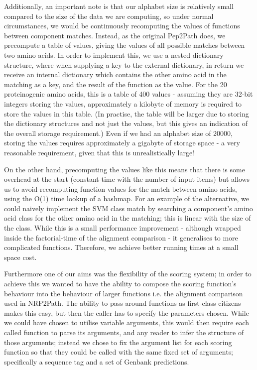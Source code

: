 \documentclass{l4proj}
\begin{document}
Additionally, an important note is that our alphabet size is relatively small compared to the size of the data we are computing, so under normal circumstances, we would be continuously recomputing the values of functions between component matches. Instead, as the original Pep2Path does, we precompute a table of values, giving the values of all possible matches between two amino acids. In order to implement this, we use a nested dictionary structure, where when supplying a key to the external dictionary, in return we receive an internal dictionary which contains the other amino acid in the matching as a key, and the result of the function as the value. For the 20 proteinogenic amino acids, this is a table of 400 values - assuming they are 32-bit integers storing the values, approximately a kilobyte of memory is required to store the values in this table. (In practise, the table will be larger due to storing the dictionary structures and not just the values, but this gives an indication of the overall storage requirement.) Even if we had an alphabet size of 20000, storing the values requires approximately a gigabyte of storage space - a very reasonable requirement, given that this is unrealistically large!

On the other hand, precomputing the values like this means that there is some overhead at the start (constant-time with the number of input items) but allows us to avoid recomputing function values for the match between amino acids, using the O(1) time lookup of a hashmap. For an example of the alternative, we could naively implement the SVM class match by searching a component's amino acid class for the other amino acid in the matching; this is linear with the size of the class. While this is a small performance improvement - although wrapped inside the factorial-time of the alignment comparison - it generalises to more complicated functions. Therefore, we achieve better running times at a small space cost.

Furthermore one of our aims was the flexibility of the scoring system; in order to achieve this we wanted to have the ability to compose the scoring function's behaviour into the behaviour of larger functions i.e. the alignment comparison used in NRP2Path. The ability to pass around functions as first-class citizens makes this easy, but then the caller has to specify the parameters chosen. While we could have chosen to utilise variable arguments, this would then require each called function to parse its arguments, and any reader to infer the structure of those arguments; instead we chose to fix the argument list for each scoring function so that they could be called with the same fixed set of arguments; specifically a sequence tag and a set of Genbank predictions.
\end{document}
